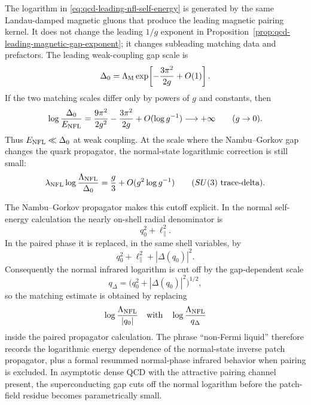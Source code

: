 \begin{remark}
\label{rem:qcd-nfl-gap-relation}
The logarithm in \eqref{eq:qcd-leading-nfl-self-energy} is generated by the
same Landau-damped magnetic gluons that produce the leading magnetic pairing
kernel.  It does not change the leading \(1/g\) exponent in
Proposition~\ref{prop:qcd-leading-magnetic-gap-exponent}; it changes
subleading matching data and prefactors.  The leading weak-coupling gap scale
is
\[
  \Delta_0
  =
  \Lambda_{\rm M}
  \exp\!\left[-\frac{3\pi^2}{2g}+O(1)\right].
\]
If the two matching scales differ only by powers of \(g\) and constants, then
\[
  \log\frac{\Delta_0}{E_{\rm NFL}}
  =
  \frac{9\pi^2}{2g^2}
  -
  \frac{3\pi^2}{2g}
  +O(\log g^{-1})
  \longrightarrow+\infty
  \qquad (g\to0).
\]
Thus \(E_{\rm NFL}\ll\Delta_0\) at weak coupling.  At the scale where the
Nambu--Gorkov gap changes the quark propagator, the normal-state logarithmic
correction is still small:
\begin{equation}
  \lambda_{\rm NFL}\log\frac{\Lambda_{\rm NFL}}{\Delta_0}
  =
  \frac{g}{3}
  +O(g^2\log g^{-1})
  \qquad (SU(3)\text{ trace-delta}).
  \label{eq:qcd-nfl-log-at-gap}
\end{equation}

The Nambu--Gorkov propagator makes this cutoff explicit.  In the normal
self-energy calculation the nearly on-shell radial denominator is
\[
  q_0^2+\ell_\parallel^2 .
\]
In the paired phase it is replaced, in the same shell variables, by
\[
  q_0^2+\ell_\parallel^2+|\Delta(q_0)|^2 .
\]
Consequently the normal infrared logarithm is cut off by the gap-dependent
scale
\[
  q_\Delta=\bigl(q_0^2+|\Delta(q_0)|^2\bigr)^{1/2},
\]
so the matching estimate is obtained by replacing
\[
  \log\frac{\Lambda_{\rm NFL}}{|q_0|}
  \quad\text{with}\quad
  \log\frac{\Lambda_{\rm NFL}}{q_\Delta}
\]
inside the paired propagator calculation.  The phrase ``non-Fermi liquid''
therefore records the logarithmic energy dependence of the normal-state
inverse patch propagator, plus a formal resummed normal-phase infrared
behavior when pairing is excluded.  In asymptotic dense QCD with the attractive
pairing channel present, the superconducting gap cuts off the normal logarithm
before the patch-field residue becomes parametrically small.
\end{remark}


